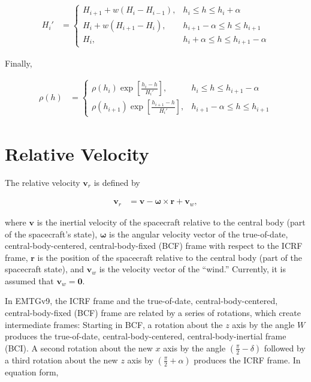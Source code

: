 \documentclass[]{article}
\newcommand{\vb}[1]{\bm{#1}} %
\begin{document}
\begin{align}
	H_i' &= \begin{cases}
	H_{i+1} + w \left( H_i - H_{i-1} \right), & h_i \leq h \leq h_i + \alpha \\
	H_i + w \left( H_{i+1} - H_i \right), & h_{i+1} - \alpha \leq h \leq h_{i+1} \\
	H_i, & h_i + \alpha \leq h \leq h_{i+1} - \alpha
	\end{cases}
\end{align}

Finally,

\begin{align}
	\rho (h) &= \begin{cases}
	\rho \left( h_i \right) \exp \left[ \frac{h_i - h}{H_i'} \right], & h_i \leq h \leq h_{i+1} - \alpha \\
	\rho \left( h_{i+1} \right) \exp \left[ \frac{h_{i+1} - h}{H_i'} \right], & h_{i+1} - \alpha \leq h \leq h_{i+1}
	\end{cases}
\end{align}

\section{Relative Velocity}
\label{sec:relative_velocity}

The relative velocity $\vb{v}_r$ is defined by

\begin{align}
	\label{eq:relative_velocity}
	\vb{v}_r &= \vb{v} - \vb{\omega} \times \vb{r} + \vb{v}_w,
\end{align}

\noindent where $\vb{v}$ is the inertial velocity of the spacecraft relative to the central body (part of the spacecraft's state), $\vb{\omega}$ is the angular velocity vector of the true-of-date, central-body-centered, central-body-fixed (BCF) frame with respect to the ICRF frame, $\vb{r}$ is the position of the spacecraft relative to the central body (part of the spacecraft state), and $\vb{v}_w$ is the velocity vector of the ``wind.'' Currently, it is assumed that $\vb{v}_w = \vb{0}$.

In EMTGv9, the ICRF frame and the true-of-date, central-body-centered, central-body-fixed (BCF) frame are related by a series of rotations, which create intermediate frames: Starting in BCF, a rotation about the $z$ axis by the angle $W$ produces the true-of-date, central-body-centered, central-body-inertial frame (BCI). A second rotation about the new $x$ axis by the angle $\left( \frac{\pi}{2} - \delta \right)$ followed by a third rotation about the new $z$ axis by $\left( \frac{\pi}{2} + \alpha \right)$ produces the ICRF frame. In equation form,
\end{document}
